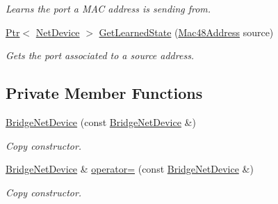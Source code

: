 \begin{DoxyCompactItemize}
\begin{DoxyCompactList}\small\item\em Learns the port a M\+AC address is sending from. \end{DoxyCompactList}\item 
\hyperlink{classns3_1_1Ptr}{Ptr}$<$ \hyperlink{classns3_1_1NetDevice}{Net\+Device} $>$ \hyperlink{classns3_1_1BridgeNetDevice_a944d20ca7524ef699812e653670407b6}{Get\+Learned\+State} (\hyperlink{classns3_1_1Mac48Address}{Mac48\+Address} source)
\begin{DoxyCompactList}\small\item\em Gets the port associated to a source address. \end{DoxyCompactList}\end{DoxyCompactItemize}
\subsection*{Private Member Functions}
\begin{DoxyCompactItemize}
\item 
\hyperlink{classns3_1_1BridgeNetDevice_a6ad6b98824ba200832d18c05ad841ecf}{Bridge\+Net\+Device} (const \hyperlink{classns3_1_1BridgeNetDevice}{Bridge\+Net\+Device} \&)
\begin{DoxyCompactList}\small\item\em Copy constructor. \end{DoxyCompactList}\item 
\hyperlink{classns3_1_1BridgeNetDevice}{Bridge\+Net\+Device} \& \hyperlink{classns3_1_1BridgeNetDevice_a8179f775c915bb7e681f05df96460f0d}{operator=} (const \hyperlink{classns3_1_1BridgeNetDevice}{Bridge\+Net\+Device} \&)
\begin{DoxyCompactList}\small\item\em Copy constructor. \end{DoxyCompactList}\end{DoxyCompactItemize}
